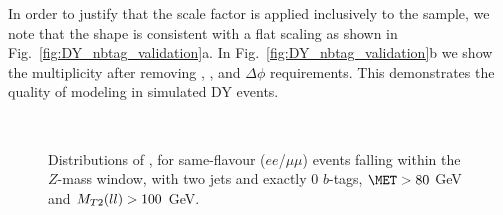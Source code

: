 In order to justify that the scale factor is applied inclusively to the sample, we note that the \Nbtags shape is consistent with a flat scaling as shown in Fig.~\ref{fig:DY_nbtag_validation}a.
In Fig.~\ref{fig:DY_nbtag_validation}b we show the \Nbtags multiplicity after removing \mtll, \ETmiss, \metSig and $\Delta\phi$ requirements. This demonstrates the quality of \Nbtags modeling in simulated DY events. 

\begin{figure}[!hbtp]
\centering
{}
 \\
\caption{Distributions of \metSig, \mtll for same-flavour ($ee$/$\mu\mu$) events falling within the $Z$-mass window, with two jets and exactly 0 $b$-tags, $\met > 80$ GeV
     and $M_{T2}(ll) > 100$ GeV.}
\label{fig:DY}
\end{figure}

